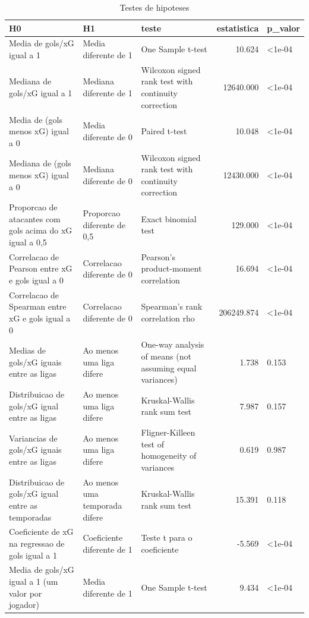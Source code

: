 \begin{table}

\caption{\label{tab:testes_g20}Testes de hipoteses}
\centering
\begin{tabular}[t]{lllrl}
\toprule
H0 & H1 & teste & estatistica & p\_valor\\
\midrule
Media de gols/xG igual a 1 & Media diferente de 1 & One Sample t-test & 10.624 & <1e-04\\
Mediana de gols/xG igual a 1 & Mediana diferente de 1 & Wilcoxon signed rank test with continuity correction & 12640.000 & <1e-04\\
Media de (gols menos xG) igual a 0 & Media diferente de 0 & Paired t-test & 10.048 & <1e-04\\
Mediana de (gols menos xG) igual a 0 & Mediana diferente de 0 & Wilcoxon signed rank test with continuity correction & 12430.000 & <1e-04\\
Proporcao de atacantes com gols acima do xG igual a 0,5 & Proporcao diferente de 0,5 & Exact binomial test & 129.000 & <1e-04\\
\addlinespace
Correlacao de Pearson entre xG e gols igual a 0 & Correlacao diferente de 0 & Pearson's product-moment correlation & 16.694 & <1e-04\\
Correlacao de Spearman entre xG e gols igual a 0 & Correlacao diferente de 0 & Spearman's rank correlation rho & 206249.874 & <1e-04\\
Medias de gols/xG iguais entre as ligas & Ao menos uma liga difere & One-way analysis of means (not assuming equal variances) & 1.738 & 0.153\\
Distribuicao de gols/xG igual entre as ligas & Ao menos uma liga difere & Kruskal-Wallis rank sum test & 7.987 & 0.157\\
Variancias de gols/xG iguais entre as ligas & Ao menos uma liga difere & Fligner-Killeen test of homogeneity of variances & 0.619 & 0.987\\
\addlinespace
Distribuicao de gols/xG igual entre as temporadas & Ao menos uma temporada difere & Kruskal-Wallis rank sum test & 15.391 & 0.118\\
Coeficiente de xG na regressao de gols igual a 1 & Coeficiente diferente de 1 & Teste t para o coeficiente & -5.569 & <1e-04\\
Media de gols/xG igual a 1 (um valor por jogador) & Media diferente de 1 & One Sample t-test & 9.434 & <1e-04\\
\bottomrule
\end{tabular}
\end{table}
